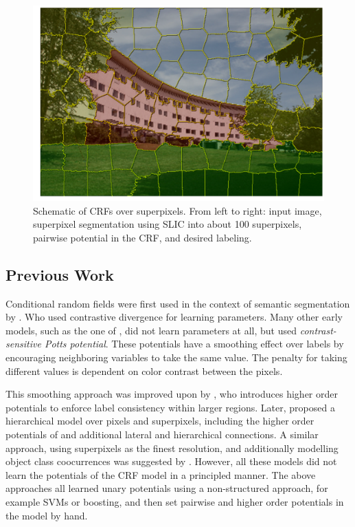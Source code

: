 \begin{figure}
\begin{tabu}
    \includegraphics[width=\linewidth]{structured_prediction/images/scene_sp_gt}
\end{tabu}
\caption{%
    Schematic of CRFs over superpixels. From left to right: input image, superpixel segmentation
    using SLIC into about 100 superpixels, pairwise potential in the CRF, and desired labeling.
}
\end{figure}


\subsection{Previous Work}
Conditional random fields were first used in the context of semantic
segmentation by \citet{he2004multiscale}.  Who used contrastive divergence for
learning parameters. Many other early models, such as the one of
\citet{shotton2006textonboost}, did not learn parameters at all, but used
\emph{contrast-sensitive Potts potential}. These potentials have a smoothing
effect over labels by encouraging neighboring variables to take the same value.
The penalty for taking different values is dependent on color contrast between
the pixels.

This smoothing approach was improved upon by \citet{kohli2009robust}, who
introduces higher order potentials to enforce label consistency within larger
regions. Later, \citet{ladicky2009associative} proposed a hierarchical model
over pixels and superpixels, including the higher order potentials of
\citet{kohli2009robust} and additional lateral and hierarchical connections. A
similar approach, using superpixels as the finest resolution, and additionally
modelling object class coocurrences was suggested by
\citet{gonfaus2010harmony}.  However, all these models did not learn the
potentials of the CRF model in a principled manner.  The above approaches all
learned unary potentials using a non-structured approach, for example SVMs or
boosting, and then set pairwise and higher order potentials in the model by
hand.

